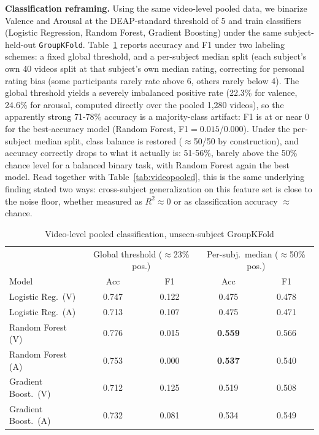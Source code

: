 \documentclass[conference]{IEEEtran}
\begin{document}
\textbf{Classification reframing.} Using the same video-level pooled
data, we binarize Valence and Arousal at the DEAP-standard threshold of 5
and train classifiers (Logistic Regression, Random Forest, Gradient
Boosting) under the same subject-held-out \texttt{GroupKFold}.
Table~\ref{tab:clf} reports accuracy and F1 under two labeling schemes:
a fixed global threshold, and a per-subject median split (each subject's
own 40 videos split at that subject's own median rating, correcting for
personal rating bias (some participants rarely rate above 6, others
rarely below 4). The global threshold yields a severely imbalanced
positive rate (22.3\% for valence, 24.6\% for arousal, computed directly
over the pooled 1,280 videos), so the apparently strong 71-78\% accuracy
is a majority-class artifact: F1 is at or near 0 for the best-accuracy
model (Random Forest, F1$=0.015$/$0.000$). Under the per-subject median
split, class balance is restored ($\approx$50/50 by construction), and
accuracy correctly drops to what it actually is: 51-56\%, barely above
the 50\% chance level for a balanced binary task, with Random Forest
again the best model. Read together with Table~\ref{tab:videopooled},
this is the same underlying finding stated two ways: cross-subject
generalization on this feature set is close to the noise floor, whether
measured as $R^2\approx 0$ or as classification accuracy $\approx$ chance.

\begin{table}[!t]
\centering
\caption{Video-level pooled classification, unseen-subject GroupKFold}
\label{tab:clf}
\small
\begin{tabular}{lcccc}
\toprule
& \multicolumn{2}{c}{Global threshold ($\approx$23\% pos.)} & \multicolumn{2}{c}{Per-subj.\ median ($\approx$50\% pos.)} \\
Model & Acc & F1 & Acc & F1 \\
\midrule
Logistic Reg.\ (V) & 0.747 & 0.122 & 0.475 & 0.478 \\
Logistic Reg.\ (A) & 0.713 & 0.107 & 0.475 & 0.471 \\
Random Forest (V)  & 0.776 & 0.015 & \textbf{0.559} & 0.566 \\
Random Forest (A)  & 0.753 & 0.000 & \textbf{0.537} & 0.540 \\
Gradient Boost.\ (V) & 0.712 & 0.125 & 0.519 & 0.508 \\
Gradient Boost.\ (A) & 0.732 & 0.081 & 0.534 & 0.549 \\
\bottomrule
\end{tabular}
\end{table}
\end{document}
